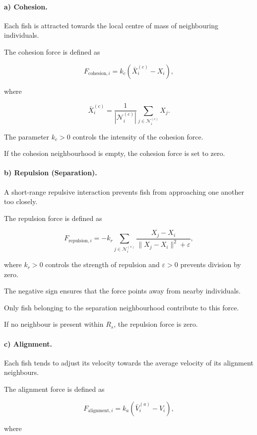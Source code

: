 \documentclass[10pt,a4paper]{article}
\begin{document}
\paragraph{a) Cohesion.}

Each fish is attracted towards the local
centre of mass of neighbouring individuals.

The cohesion force is defined as

\[
F_{\mathrm{cohesion},i}
=
k_c
\left(
\bar X_i^{(c)}-X_i
\right),
\]

where

\[
\bar X_i^{(c)}
=
\frac{1}{|\mathcal N_i^{(c)}|}
\sum_{j\in\mathcal N_i^{(c)}}X_j.
\]

The parameter $k_c>0$ controls the intensity
of the cohesion force.

If the cohesion neighbourhood is empty,
the cohesion force is set to zero.

\paragraph{b) Repulsion (Separation).}

A short-range repulsive interaction prevents
fish from approaching one another too closely.

The repulsion force is defined as

\[
F_{\mathrm{repulsion},i}
=
-k_r
\sum_{j\in\mathcal N_i^{(s)}}
\frac{X_j-X_i}
{\|X_j-X_i\|^2+\varepsilon},
\]

where $k_r>0$ controls the strength of
repulsion and $\varepsilon>0$ prevents
division by zero.

The negative sign ensures that the force
points away from nearby individuals.

Only fish belonging to the separation
neighbourhood contribute to this force.

If no neighbour is present within $R_s$,
the repulsion force is zero.

\paragraph{c) Alignment.}

Each fish tends to adjust its velocity
towards the average velocity of its
alignment neighbours.

The alignment force is defined as

\[
F_{\mathrm{alignment},i}
=
k_a
\left(
\bar V_i^{(a)}-V_i
\right),
\]

where
\end{document}
